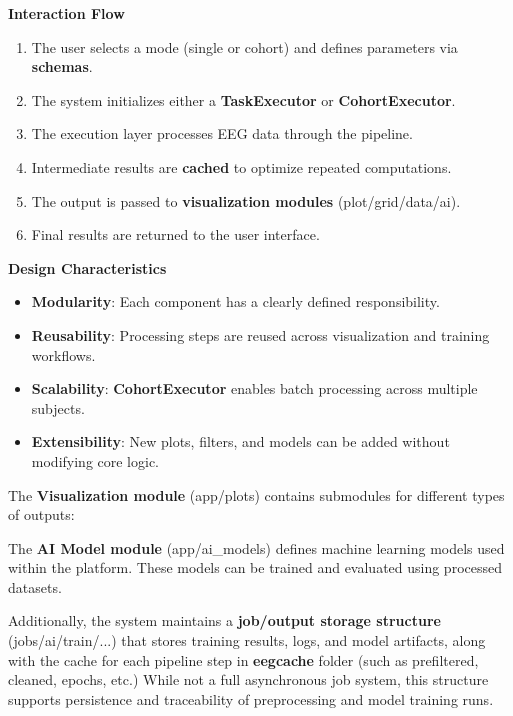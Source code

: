 \noindent\textbf{Interaction Flow}
\begin{enumerate}
    \item The user selects a mode (single or cohort) and defines parameters via \textbf{schemas}.
    \item The system initializes either a \textbf{TaskExecutor} or \textbf{CohortExecutor}.
    \item The execution layer processes EEG data through the pipeline.
    \item Intermediate results are \textbf{cached} to optimize repeated computations.
    \item The output is passed to \textbf{visualization modules} (plot/grid/data/ai).
    \item Final results are returned to the user interface.
\end{enumerate}

\noindent\textbf{Design Characteristics}
\begin{itemize}
    \item \textbf{Modularity}: Each component has a clearly defined responsibility.
    \item \textbf{Reusability}: Processing steps are reused across visualization and training workflows.
    \item \textbf{Scalability}: \textbf{CohortExecutor} enables batch processing across multiple subjects.
    \item \textbf{Extensibility}: New plots, filters, and models can be added without modifying core logic.
\end{itemize}

The \textbf{Visualization module} (app/plots) contains submodules for different types of outputs:
\vspace{0.5em}

The \textbf{AI Model module} (app/ai\_models) defines machine learning models used within the platform. These models can be trained and evaluated using processed datasets.
\vspace{0.5em}

Additionally, the system maintains a \textbf{job/output storage structure} (jobs/ai/train/...) that stores training results, logs, and model artifacts, along with the cache for each pipeline step in \textbf{eegcache} folder (such as prefiltered, cleaned, epochs, etc.) While not a full asynchronous job system, this structure supports persistence and traceability of preprocessing and model training runs.
\vspace{0.5em}

